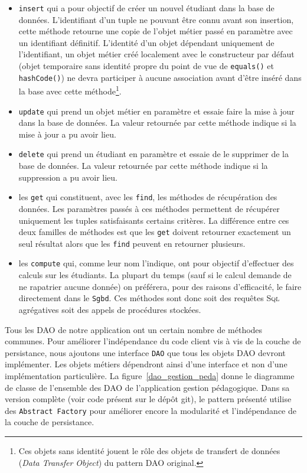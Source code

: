 \documentclass[a4paper,11pt]{article}
\begin{document}
\begin{itemize}
	\item \texttt{insert} qui a pour objectif de créer un nouvel étudiant dans la base de données.
	L'identifiant d'un tuple ne pouvant être connu avant son insertion, cette méthode retourne 
	une copie de l'objet métier passé en paramètre avec un identifiant définitif. L'identité d'un 
	objet dépendant uniquement de l'identifiant, un objet métier créé localement avec le 
	constructeur par défaut (objet temporaire sans identité propre du point de vue de 
	\texttt{equals()} et \texttt{hashCode()}) ne devra participer à aucune association 
	avant d'être inséré dans la base avec cette méthode\footnote{Ces objets sans identité jouent le rôle des objets 
	de transfert de données (\textit{Data Transfer Object}) du pattern DAO original.}.

	\item \texttt{update} qui prend un objet métier en paramètre et essaie faire la mise à jour 
	dans la base de données. La valeur retournée par cette méthode indique si la mise à jour 
	a pu avoir lieu.
	
  \item \texttt{delete} qui prend un étudiant en paramètre et essaie de le supprimer de la base 
  de données. La valeur retournée par cette méthode indique si la suppression a pu avoir lieu.
  
  \item les \texttt{get} qui constituent, avec les \texttt{find}, les méthodes 
  de récupération des données. Les paramètres passés à ces méthodes permettent de récupérer
  uniquement les tuples satisfaisants certains critères. La différence entre ces deux 
  familles de méthodes est que les \texttt{get} doivent retourner exactement un seul 
  résultat alors que les \texttt{find} peuvent en retourner plusieurs.
  
  \item les \texttt{compute} qui, comme leur nom l'indique, ont pour objectif d'effectuer des 
  calculs sur les étudiants. La plupart du temps (sauf si le calcul demande de ne rapatrier 
  aucune donnée) on préférera, pour des raisons d'efficacité, le faire directement dans le \texttt{Sgbd}. 
  Ces méthodes sont donc soit des requêtes \textsc{Sql} agrégatives soit des appels de procédures stockées.	
\end{itemize}

Tous les DAO de notre application ont un certain nombre de méthodes communes. Pour améliorer l'indépendance du code client
vis à vis de la couche de persistance, nous ajoutons une interface \texttt{DAO} que tous les objets DAO devront implémenter. 
Les objets métiers dépendront ainsi d'une interface et non d'une implémentation particulière. La figure~\ref{dao_gestion_peda}
donne le diagramme de classe de l'ensemble des DAO de l'application gestion pédagogique. Dans sa version complète (voir 
code présent sur le dépôt git), le pattern présenté utilise des \texttt{Abstract Factory} pour améliorer encore la 
modularité et l'indépendance de la couche de persistance.  
\end{document}

